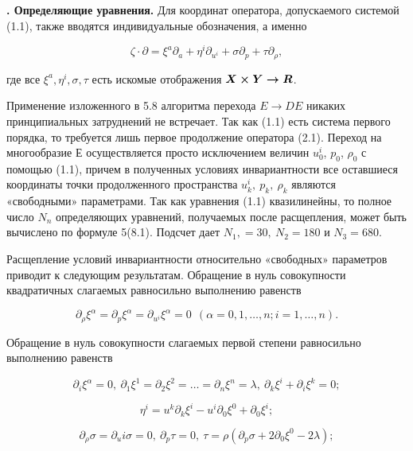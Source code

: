 \documentclass{report}
\newcounter{nrazd}
\newcommand{\razd}[1]{\addtocounter{nrazd}{1}
	\setcounter{equation}{0}
	\textbf{\thenrazd. #1}}
\newcommand{\bm}[1]{\mbox{\boldmath{\(#1\)}}}
\begin{document}
	\razd{Определяющие уравнения.} Для координат оператора, допускаемого
	системой (1.1), также вводятся индивидуальные обозначения, а именно

	\begin{equation} \label{eq2.1}
		\zeta\cdot\partial=\xi^a \partial_a + \eta^i \partial_{u^i} + \sigma\partial_p + \tau\partial_\rho,
	\end{equation}

	\noindent где все $\xi^a, \eta^i, \sigma, \tau$ есть искомые отображения $\bm{X \times Y\rightarrow R}$.

	Применение изложенного в 5.8 алгоритма перехода $E \rightarrow DE$
	никаких принципиальных затруднений не встречает. Так как
	(1.1) есть система первого порядка, то требуется лишь первое
	продолжение оператора (2.1). Переход на многообразие Е осуществляется
	просто исключением величин $u^i_0$, $p_0$, $\rho_0$ с помощью
	\noindent (1.1), причем в полученных условиях инвариантности все оставшиеся
	координаты точки продолженного пространства $u^i_k, \ p_k, \ \rho_k  $ являются
	«свободными» параметрами. Так как уравнения (1.1) квазилинейны, то полное число
	$N_n$ определяющих уравнений, получаемых после расщепления, может быть вычислено по формуле
	5(8.1). Подсчет дает $N_1,=30,\ N_2=180$ и $N_3=680$.

	Расщепление условий инвариантности относительно «свободных» параметров приводит к следующим результатам.
	Обращение в нуль совокупности квадратичных слагаемых равносильно выполнению равенств

	\begin{equation} \label{eq2.2}
		\partial_\rho \xi^\alpha = \partial_p \xi^\alpha = \partial_{u^i} \xi^\alpha = 0
		\ \ (\alpha = 0, 1, \ldots, n; i=1,\ldots,n).
	\end{equation}

	\noindent Обращение в нуль совокупности слагаемых первой степени равносильно выполнению равенств

	\begin{equation} \label{eq2.3}
		\partial_i \xi^\alpha = 0, \ \partial_1 \xi^1 = \partial_2 \xi^2 = \ldots = \partial_n \xi^n = \lambda, \ \partial_k \xi^i + \partial_i \xi^k = 0;
	\end{equation}

	\begin{equation} \label{eq2.4}
		\eta^i = u^k \partial_k \xi^i - u^i \partial_0 \xi^0 + \partial_0 \xi^i;
	\end{equation}

	\begin{equation} \label{eq2.5}
		\partial_\rho \sigma = \partial_u i \sigma = 0, \ \partial_p \tau = 0, \ \tau = \rho(\partial_p \sigma + 2\partial_0 \xi^0 - 2\lambda);
	\end{equation}
\end{document}
